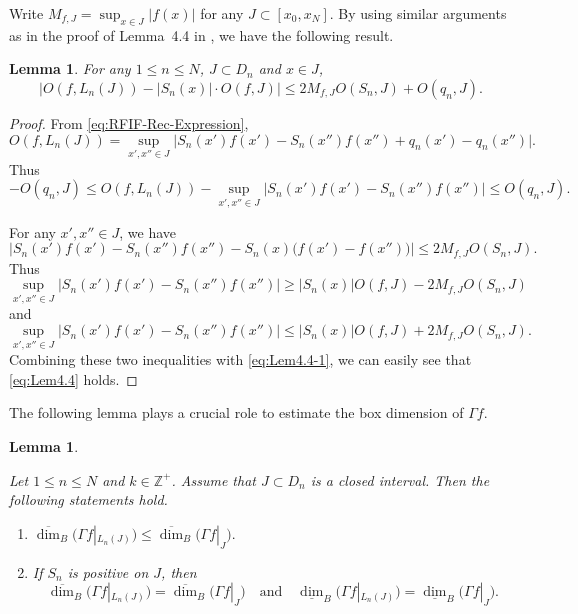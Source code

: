 \documentclass[11pt]{amsart}
\newtheorem{lem}[thm]{Lemma}
\theoremstyle{definition}
\theoremstyle{remark}
\numberwithin{equation}{section}
\newcommand{\Z}{{\mathbb Z}}
\def\updimB{\overline{\dim}_B}
\def\lowdimB{\underline{\dim}_B}
\begin{document}
Write $M_{f,J}=\sup_{x \in J}|f(x)|$ for any $J\subset [x_0,x_N]$.
By using similar arguments as in the proof of Lemma~4.4 in \cite{JR24}, we have the following result. 
\begin{lem}\label{lem:3-osci-1}
	For any $1\leq n \leq N$, $J\subset D_n$ and $x \in J$, 
	\begin{equation}\label{eq:Lem4.4}	
		\Big| O(f,L_n(J)) -|S_n(x)| \cdot O(f,J) \Big|\leq 2 M_{f,J} O(S_n,J)+O(q_n,J).
	\end{equation}
\end{lem}

\begin{proof}
	From \eqref{eq:RFIF-Rec-Expression},
	\[
		O(f,L_n(J))=\sup_{x',x'' \in J}\big|S_n(x')f(x')-S_n(x'')f(x'') + q_n(x')-q_n(x'')\big|.
	\]
	Thus
	\begin{equation}\label{eq:Lem4.4-1}
		-O(q_n,J) \leq O(f,L_n(J))-\sup_{x',x'' \in J}\big|S_n(x')f(x')-S_n(x'')f(x'')\big| \leq O(q_n,J).
	\end{equation}
	
	For any $x',x''\in J$, we have 
	\[
	  \big|S_n(x')f(x')-S_n(x'')f(x'') - S_n(x)\big(f(x')-f(x'')\big)\big| \leq 2M_{f,J}O(S_n,J). 
	\]
	Thus
	\[
	  \sup_{x',x''\in J}\big|S_n(x')f(x')-S_n(x'')f(x'')|\geq |S_n(x)|O(f,J)-2M_{f,J} O(S_n,J) 
	\]
	and
	\[
	  \sup_{x',x''\in J}\big|S_n(x')f(x')-S_n(x'')f(x'')|\leq |S_n(x)|O(f,J)+2M_{f,J} O(S_n,J).
	\]
	Combining these two inequalities with \eqref{eq:Lem4.4-1}, we can easily see that \eqref{eq:Lem4.4} holds.
\end{proof}

The following lemma plays a crucial role to estimate the box dimension of $\Gamma f$.


\begin{lem}\label{lem:box-pass}
	
	
	Let $1 \leq n \leq N$ and $k \in \Z^+$. Assume that $J\subset D_n$ is a closed interval. Then the following statements hold.
	\begin{enumerate}
		\item 
		$ \updimB \big(\Gamma f|_{L_n(J)} \big) \leq  \updimB \big(\Gamma f|_{J} \big).$	
		\item If $S_n$ is positive on $J$, then 
		$$
		 \updimB \big(\Gamma f|_{L_n(J)} \big)= \updimB \big(\Gamma f|_J \big)\quad \mbox{and}\quad
		\lowdimB \big(\Gamma f|_{L_n(J)} \big)=\lowdimB \big(\Gamma f|_J \big).
		$$		
	\end{enumerate}
\end{lem}
\end{document}
